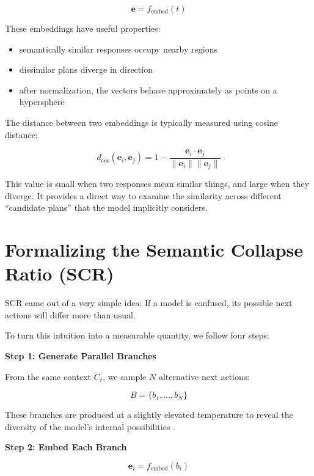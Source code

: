 \documentclass[12pt,a4paper]{report}
\begin{document}
\begin{equation}
\mathbf{e} = f_{\text{embed}}(t)
\end{equation}

These embeddings have useful properties:
\begin{itemize}
    \item semantically similar responses occupy nearby regions
    \item dissimilar plans diverge in direction
    \item after normalization, the vectors behave approximately as points on a hypersphere
\end{itemize}

The distance between two embeddings is typically measured using cosine distance:

\begin{equation}
d_{\cos}(\mathbf{e}_i, \mathbf{e}_j) = 1 - \frac{\mathbf{e}_i \cdot \mathbf{e}_j}{\|\mathbf{e}_i\| \|\mathbf{e}_j\|}
\end{equation}

This value is small when two responses mean similar things, and large when they diverge. It provides a direct way to examine the similarity across different “candidate plans” that the model implicitly considers.

\section{Formalizing the Semantic Collapse Ratio (SCR)}
SCR came out of a very simple idea: If a model is confused, its possible next actions will differ more than usual.

To turn this intuition into a measurable quantity, we follow four steps:

\textbf{Step 1: Generate Parallel Branches}

From the same context $C_t$, we sample $N$ alternative next actions:

\begin{equation}
B = \{ b_1, \dots, b_N \}
\end{equation}

These branches are produced at a slightly elevated temperature to reveal the diversity of the model’s internal possibilities \cite{Zhou2024Consistency}.

\textbf{Step 2: Embed Each Branch}

\begin{equation}
\mathbf{e}_i = f_{\text{embed}}(b_i)
\end{equation}
\end{document}
